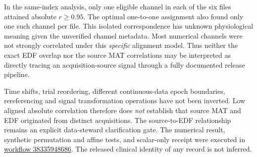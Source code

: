 In the same-index analysis, only one
eligible channel in each of the six
files attained absolute $r\geq0.95$.
The optimal one-to-one assignment
also found only one such
channel per file. This isolated
correspondence has unknown
physiological meaning given the
unverified channel metadata.
Most numerical channels were
not strongly correlated under this
\emph{specific} alignment model.
Thus neither the exact EDF overlap
nor the source MAT correlations
may be interpreted as directly
tracing an acquisition-source
signal through a fully documented
release pipeline.

Time shifts, trial reordering,
different continuous-data epoch
boundaries, rereferencing and
signal transformation operations
have not been inverted. Low
aligned absolute correlation therefore
does \emph{not} establish that
source MAT and EDF originated
from distinct acquisitions.
The source-to-EDF relationship
remains an explicit data-steward
clarification gate. The numerical
result, synthetic permutation and
affine tests, and scalar-only
receipt were executed in
\href{https://github.com/lindicaphxag-tech/kaggle/actions/runs/38335948686}{workflow 38335948686}.
The released clinical identity
of any record is not inferred.

